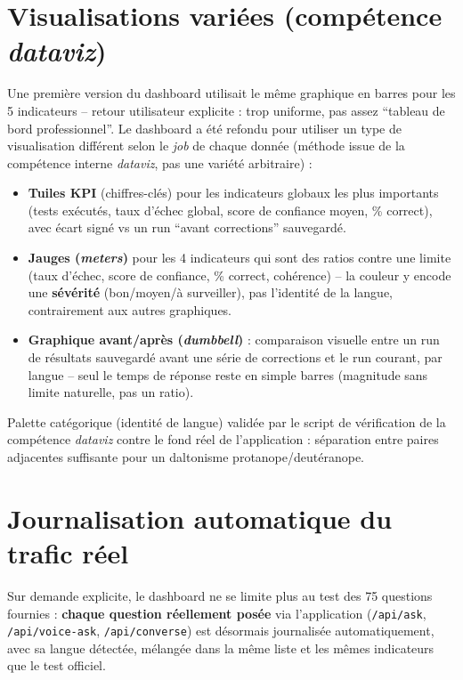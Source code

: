 \documentclass[11pt,a4paper]{report}
\begin{document}
\section{Visualisations variées (compétence \emph{dataviz})}
Une première version du dashboard utilisait le même graphique en barres pour les 5
indicateurs -- retour utilisateur explicite : trop uniforme, pas assez ``tableau de bord
professionnel''. Le dashboard a été refondu pour utiliser un type de visualisation
différent selon le \emph{job} de chaque donnée (méthode issue de la compétence interne
\emph{dataviz}, pas une variété arbitraire) :
\begin{itemize}
    \item \textbf{Tuiles KPI} (chiffres-clés) pour les indicateurs globaux les plus
    importants (tests exécutés, taux d'échec global, score de confiance moyen,
    \% correct), avec écart signé vs un run ``avant corrections'' sauvegardé.
    \item \textbf{Jauges (\emph{meters})} pour les 4 indicateurs qui sont des ratios
    contre une limite (taux d'échec, score de confiance, \% correct, cohérence) -- la
    couleur y encode une \textbf{sévérité} (bon/moyen/à surveiller), pas l'identité de la
    langue, contrairement aux autres graphiques.
    \item \textbf{Graphique avant/après (\emph{dumbbell})} : comparaison visuelle entre un
    run de résultats sauvegardé avant une série de corrections et le run courant, par
    langue -- seul le temps de réponse reste en simple barres (magnitude sans limite
    naturelle, pas un ratio).
\end{itemize}
Palette catégorique (identité de langue) validée par le script de vérification de la
compétence \emph{dataviz} contre le fond réel de l'application : séparation entre paires
adjacentes suffisante pour un daltonisme protanope/deutéranope.

\section{Journalisation automatique du trafic réel}
\label{sec:quality-log}
Sur demande explicite, le dashboard ne se limite plus au test des 75 questions fournies :
\textbf{chaque question réellement posée} via l'application (\texttt{/api/ask},
\texttt{/api/voice-ask}, \texttt{/api/converse}) est désormais journalisée
automatiquement, avec sa langue détectée, mélangée dans la même liste et les mêmes
indicateurs que le test officiel.
\end{document}
